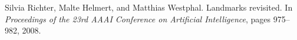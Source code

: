 \begin{thebibliography}{10}
\footnotesize

Silvia Richter, Malte Helmert, and Matthias Westphal.
\newblock Landmarks revisited.
\newblock In {\em Proceedings of the 23rd AAAI Conference on Artificial
Intelligence}, pages 975--982, 2008.
\end{thebibliography}
